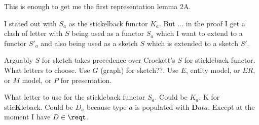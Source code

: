 This is enough to get me the first representation lemma 2A.

\begin{aside}
I stated out with $S_a$ as the stickelback functor $K_a$.
But ... in the proof I get a clash of letter with $S$ being used as 
a functor $S_a$ which I want to extend to a functor $S'_a$ and also
being used as a sketch $S$ which is extended to a sketch $S'$.

Arguably $S$ for sketch takes precedence over Crockett's $S$ for 
stickleback functor.
What letters to choose. Use $G$ (graph) for sketch??. Use $E$, entity model, or $ER$, or $M$ model, or $P$ for presentation.

What letter to use for the stickleback functor $S_a$. Could be $K_a$. 
K for stic\textbf{K}leback. Could be $D_a$ because type $a$ is populated with $\textbf{D}ata$. Except at the moment I have $D \in \reqt$.
\end{aside}
